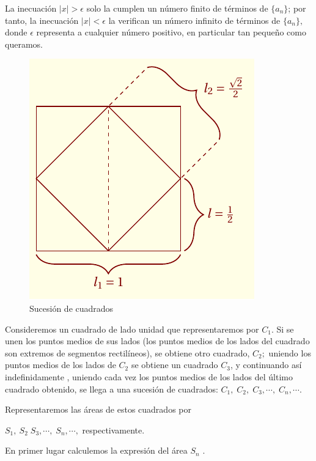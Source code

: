 \documentclass[oneside,english,spanish,2m,twoside,svgnames,x11names,HTML,twoside,12pt]{libro-matua}\usepackage[]{graphicx}\usepackage[]{color}
\newcommand{\val}[1]{\left|#1\right|}
\begin{document}
La inecuación $\val{x}>\epsilon$ solo la cumplen un número finito
de términos de $\{a_{n}\}$; por tanto, la inecuación $\val{x}<\epsilon$
la verifican un número infinito de términos de $\{a_{n}\},$ donde
$\epsilon$ representa a cualquier número positivo, en particular
tan pequeño como queramos. 

\begin{ejemplo}\label{ej:lim33}

\begin{figure} \centering

\includegraphics{9_home_antalcides_MEGA_calculo_I_libro_pdf_cal_lim7.pdf}
\caption{Sucesi\'on de cuadrados}
\label{fig:cal_lim7} \end{figure}

Consideremos un cuadrado de lado unidad que representaremos por $C_{1}.$
Si se unen los puntos medios de sus lados (los puntos medios de los
lados del cuadrado son extremos de segmentos rectilíneos), se obtiene
otro cuadrado, $C_{2};$ uniendo los puntos medios de los lados de
$C_{2}$ se obtiene un cuadrado $C_{3}$, y continuando así indefinidamente
, uniendo cada vez los puntos medios de los lados del último cuadrado
obtenido, se llega a una sucesión de cuadrados: $C_{1},\;C_{2},\;C_{3},\cdots,\;C_{n},\cdots$.

Representaremos las áreas de estos cuadrados por

$S_{1},\:S_{2}\;S_{3},\cdots,\;S_{n},\cdots,$ respectivamente.

En primer lugar calculemos la expresión del área $S_{n}$ .


\end{ejemplo}
\end{document}
